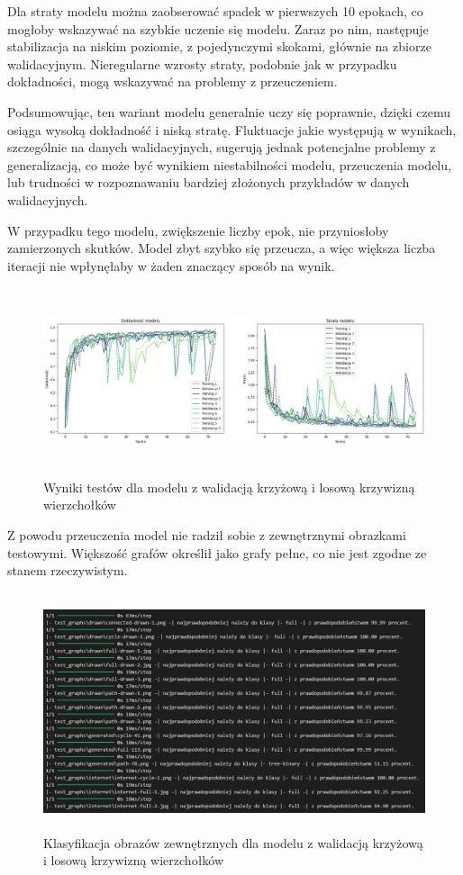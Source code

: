 Dla straty modelu można zaobserować spadek w pierwszych 10 epokach, co mogłoby wskazywać na szybkie uczenie się modelu.
Zaraz po nim, następuje stabilizacja na niskim poziomie, z pojedynczymi skokami, głównie na zbiorze walidacyjnym.
Nieregularne wzrosty straty, podobnie jak w przypadku dokładności, mogą wskazywać na problemy z przeuczeniem.

Podsumowując, ten wariant modelu generalnie uczy się poprawnie, dzięki czemu osiąga wysoką dokładność i niską stratę.
Fluktuacje jakie występują w wynikach, szczególnie na danych walidacyjnych,
sugerują jednak potencjalne problemy z generalizacją, co może być wynikiem niestabilności modelu,
przeuczenia modelu, lub trudności w rozpoznawaniu bardziej złożonych przykładów w danych walidacyjnych.

W przypadku tego modelu, zwiększenie liczby epok, nie przyniosłoby zamierzonych skutków.
Model zbyt szybko się przeucza, a więc większa liczba iteracji nie wpłynęłaby w żaden znaczący sposób na wynik.


\begin{figure}[ht]
	\centering
	\includegraphics[height=5.5cm]{resources/tests/images/v3/crossvalid_img.png}
	\caption{Wyniki testów dla modelu z walidacją krzyżową i losową krzywizną wierzchołków}
	\label{Fig:tests-cv-1}
\end{figure}
\FloatBarrier

Z powodu przeuczenia model nie radził sobie z zewnętrznymi obrazkami testowymi.
Większość grafów określił jako grafy pełne, co nie jest zgodne ze stanem rzeczywistym.

\begin{figure}[ht]
	\centering
	\includegraphics[height=7cm]{resources/tests/images/v3/crossvalid_txt.png}
	\caption{Klasyfikacja obrazów zewnętrznych dla modelu z walidacją krzyżową i losową krzywizną wierzchołków}
	\label{Fig:tests-cv-2}
\end{figure}
\FloatBarrier